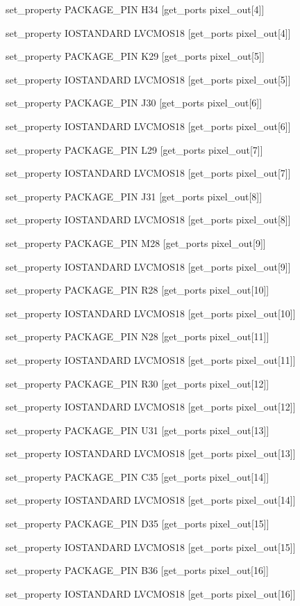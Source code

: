 set\_property PACKAGE\_PIN H34 [get\_ports {pixel\_out[4]}]

set\_property IOSTANDARD LVCMOS18 [get\_ports {pixel\_out[4]}]

set\_property PACKAGE\_PIN K29 [get\_ports {pixel\_out[5]}]

set\_property IOSTANDARD LVCMOS18 [get\_ports {pixel\_out[5]}]

set\_property PACKAGE\_PIN J30 [get\_ports {pixel\_out[6]}]

set\_property IOSTANDARD LVCMOS18 [get\_ports {pixel\_out[6]}]

set\_property PACKAGE\_PIN L29 [get\_ports {pixel\_out[7]}]

set\_property IOSTANDARD LVCMOS18 [get\_ports {pixel\_out[7]}]

set\_property PACKAGE\_PIN J31 [get\_ports {pixel\_out[8]}]

set\_property IOSTANDARD LVCMOS18 [get\_ports {pixel\_out[8]}]

set\_property PACKAGE\_PIN M28 [get\_ports {pixel\_out[9]}]

set\_property IOSTANDARD LVCMOS18 [get\_ports {pixel\_out[9]}]

set\_property PACKAGE\_PIN R28 [get\_ports {pixel\_out[10]}]

set\_property IOSTANDARD LVCMOS18 [get\_ports {pixel\_out[10]}]

set\_property PACKAGE\_PIN N28 [get\_ports {pixel\_out[11]}]

set\_property IOSTANDARD LVCMOS18 [get\_ports {pixel\_out[11]}]

set\_property PACKAGE\_PIN R30 [get\_ports {pixel\_out[12]}]

set\_property IOSTANDARD LVCMOS18 [get\_ports {pixel\_out[12]}]

set\_property PACKAGE\_PIN U31 [get\_ports {pixel\_out[13]}]

set\_property IOSTANDARD LVCMOS18 [get\_ports {pixel\_out[13]}]

set\_property PACKAGE\_PIN C35 [get\_ports {pixel\_out[14]}]

set\_property IOSTANDARD LVCMOS18 [get\_ports {pixel\_out[14]}]

set\_property PACKAGE\_PIN D35 [get\_ports {pixel\_out[15]}]

set\_property IOSTANDARD LVCMOS18 [get\_ports {pixel\_out[15]}]

set\_property PACKAGE\_PIN B36 [get\_ports {pixel\_out[16]}]

set\_property IOSTANDARD LVCMOS18 [get\_ports {pixel\_out[16]}]

